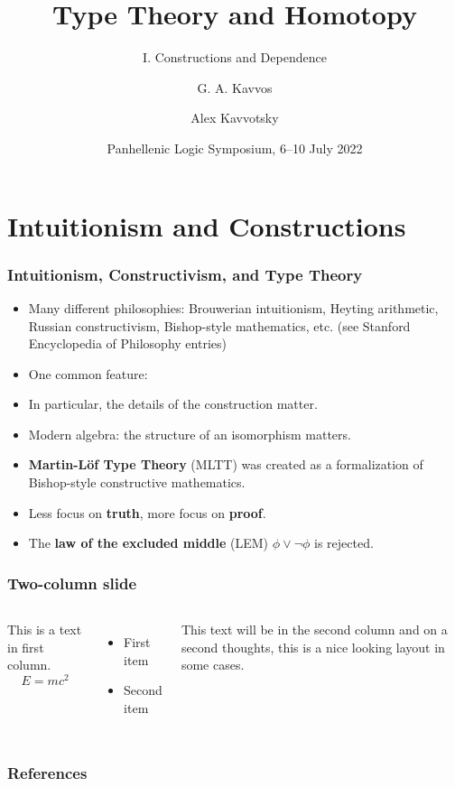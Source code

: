 \documentclass{beamer} %
\title{Type Theory and Homotopy}
\subtitle{I. Constructions and Dependence}
\author{
  G. A. Kavvos \inst{1}
  \and
  Alex Kavvotsky \inst{2}
}
\institute{
  \inst{1} University of Bristol
  \inst{2} Technological University of Elbonia
}
\date{Panhellenic Logic Symposium, 6--10 July 2022}
\begin{document}
\frame{\titlepage}


\section{Intuitionism and Constructions}

\begin{frame}
  \frametitle{Intuitionism, Constructivism, and Type Theory}
  
  \begin{itemize}
    \item Many different philosophies: Brouwerian intuitionism, Heyting
      arithmetic, Russian constructivism, Bishop-style mathematics, etc. (see
      Stanford Encyclopedia of Philosophy entries)

    \item One common feature:
      \begin{center}
      \end{center}
      
    \item In particular, the details of the construction matter.
      
    \item Modern algebra: the structure of an isomorphism matters.

    \item \textbf{Martin-L\"of Type Theory} (MLTT) was created as a
      formalization of Bishop-style constructive mathematics.
      
    \item Less focus on \textbf{truth}, more focus on \textbf{proof}.

    \item The \textbf{law of the excluded middle} (LEM) $\phi \lor \lnot \phi$
      is rejected.
  \end{itemize}
\end{frame}

\begin{frame}
  \frametitle{Two-column slide}
  \begin{columns}
  This is a text in first column.
  $$E=mc^2$$
  \begin{itemize}
  \item First item
  \item Second item
  \end{itemize}
  
  This text will be in the second column
  and on a second thoughts, this is a nice looking
  layout in some cases.
  \end{columns}
  \end{frame}


\begin{frame}
  \frametitle{References}
  
  
  \nocite{martin-lof_1975}
\end{frame}
\end{document}
